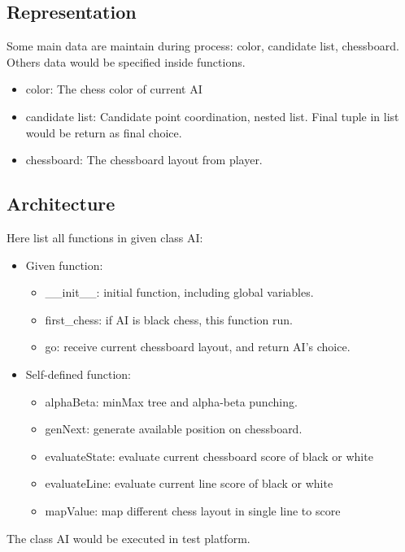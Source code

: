 \documentclass[conference,compsoc]{IEEEtran}
\begin{document}
\subsection{Representation}
Some main data are maintain during process: color, candidate list, chessboard.
Others data would be specified inside functions.

\begin{itemize}
  \item color: The chess color of current AI
  \item candidate list: Candidate point coordination, nested list. Final tuple in
  list would be return as final choice.
  \item chessboard: The chessboard  layout from player.
\end{itemize}


\subsection{Architecture}
Here list all functions in given class AI:
\begin{itemize}
  \item Given function:
  \begin{itemize}
    \item \_\_init\_\_: initial function, including global variables.
    \item first\_chess: if AI is black chess, this function run.
    \item go: receive current chessboard layout, and return AI's choice.
  \end{itemize}
  \item Self-defined function:
    \begin{itemize}
      \item alphaBeta: minMax tree and alpha-beta punching.
      \item genNext: generate available position on chessboard.
      \item evaluateState: evaluate current chessboard score of black or white
      \item evaluateLine: evaluate current line score of black or white
      \item mapValue: map different chess layout in single line to score
    \end{itemize}
\end{itemize}
The class AI would be executed in test platform.
\end{document}
